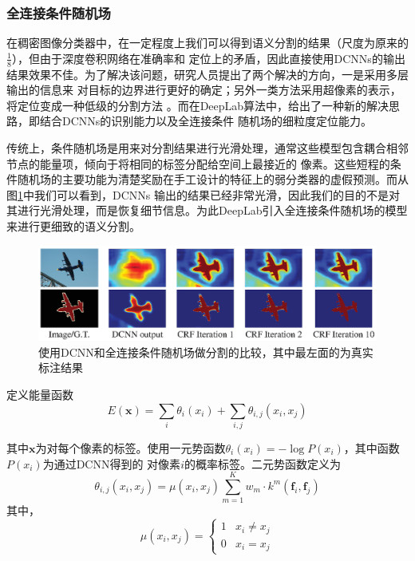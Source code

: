 \documentclass[10pt, a4paper]{article}
\begin{document}
\subsubsection{全连接条件随机场}
在稠密图像分类器中，在一定程度上我们可以得到语义分割的结果（尺度为原来的$\frac{1}{8}$），但由于深度卷积网络在准确率和
定位上的矛盾，因此直接使用DCNNs的输出结果效果不佳。为了解决该问题，研究人员提出了两个解决的方向，一是采用多层输出的信息来
对目标的边界进行更好的确定\cite{FCN,eigen2015predicting}；另外一类方法采用超像素的表示，将定位变成一种低级的分割方法
\cite{mostajabi2015feedforward}。而在DeepLab算法中，给出了一种新的解决思路，即结合DCNNs的识别能力以及全连接条件
随机场的细粒度定位能力。

传统上，条件随机场是用来对分割结果进行光滑处理，通常这些模型包含耦合相邻节点的能量项，倾向于将相同的标签分配给空间上最接近的
像素。这些短程的条件随机场的主要功能为清楚奖励在手工设计的特征上的弱分类器的虚假预测。而从图\ref{p3}中我们可以看到，DCNNs
输出的结果已经非常光滑，因此我们的目的不是对其进行光滑处理，而是恢复细节信息。为此DeepLab引入全连接条件随机场的模型\cite{FC-CRF}
来进行更细致的语义分割。

\begin{figure}[htbp]
    \centering
    \includegraphics[width=\textwidth]{imgs/p3.eps}
    \caption{使用DCNN和全连接条件随机场做分割的比较，其中最左面的为真实标注结果}
    \label{p3}
\end{figure}

定义能量函数
\begin{equation}
    E(\bm{x}) = \sum_i \theta_i(x_i) + \sum_{i,j}\theta_{i, j}(x_i, x_j)
\end{equation}

其中$\bm{x}$为对每个像素的标签。使用一元势函数$\theta_i(x_i) = -\log P(x_i)$，其中函数$P(x_i)$为通过DCNN得到的
对像素$i$的概率标签。二元势函数定义为
\[
    \theta_{i, j}(x_i, x_j) = \mu(x_i, x_j)\sum_{m=1}^K w_m\cdot k^m(\bm{f}_i, \bm{f}_j)
\]
其中，
\[
    \mu(x_i, x_j) = 
    \begin{cases}
        1 & x_i \neq x_j \\
         0 & x_i = x_j
    \end{cases} 
\]
\end{document}
